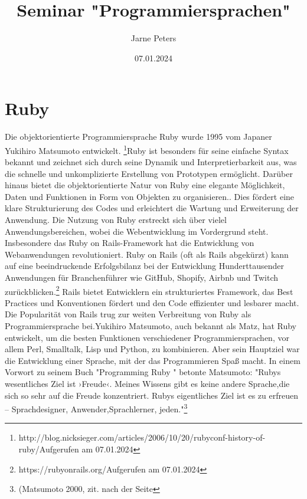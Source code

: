 \documentclass{article}
\title{Seminar "Programmiersprachen" }
\author{Jarne Peters}
\date{07.01.2024}
\begin{document}
\maketitle


\section*{Ruby}

Die objektorientierte Programmiersprache Ruby wurde 1995 vom Japaner Yukihiro Matsumoto entwickelt. \footnote{http://blog.nicksieger.com/articles/2006/10/20/rubyconf-history-of-ruby/Aufgerufen am 07.01.2024}Ruby ist besonders für seine einfache Syntax bekannt und zeichnet sich durch seine Dynamik und Interpretierbarkeit aus, was die schnelle und unkomplizierte Erstellung von Prototypen ermöglicht. Darüber hinaus bietet die objektorientierte Natur von Ruby eine elegante Möglichkeit, Daten und Funktionen in Form von Objekten zu organisieren.. Dies fördert eine klare Strukturierung des Codes und erleichtert die Wartung und Erweiterung der Anwendung. Die Nutzung von Ruby erstreckt sich über vielel Anwendungsbereichen, wobei die Webentwicklung im Vordergrund steht. Insbesondere das Ruby on Rails-Framework hat die Entwicklung von Webanwendungen revolutioniert. Ruby on Rails (oft als Rails abgekürzt) kann auf eine beeindruckende Erfolgsbilanz bei der Entwicklung Hunderttausender Anwendungen für Branchenführer wie GitHub, Shopify, Airbnb und Twitch zurückblicken.\footnote{https://rubyonrails.org/Aufgerufen am 07.01.2024} Rails bietet Entwicklern ein strukturiertes Framework, das Best Practices und Konventionen fördert und den Code effizienter und lesbarer macht. Die Popularität von Rails trug zur weiten Verbreitung von Ruby als Programmiersprache bei.Yukihiro Matsumoto, auch bekannt als Matz, hat Ruby entwickelt, um die besten Funktionen verschiedener Programmiersprachen, vor allem Perl, Smalltalk, Lisp und Python, zu kombinieren. Aber sein Hauptziel war die Entwicklung einer Sprache, mit der das Programmieren Spaß macht. In einem Vorwort zu seinem Buch "Programming Ruby " betonte Matsumoto: "Rubys wesentliches Ziel ist ›Freude‹. Meines Wissens gibt es keine andere Sprache,die sich so sehr auf die Freude konzentriert. Rubys eigentliches Ziel ist es zu erfreuen – Sprachdesigner, Anwender,Sprachlerner, jeden."\footnote{(Matsumoto 2000, zit. nach der Seite
}
\end{document}
